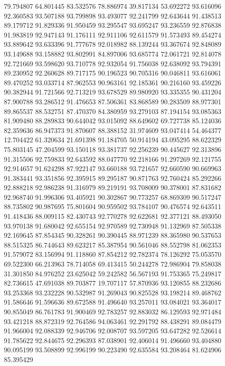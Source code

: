 79.794807
64.801445
83.532576
78.886974
39.817134
53.692272
93.616096
92.360583
93.507188
93.799898
93.493077
92.241799
92.643644
91.438513
89.179712
91.829336
91.950459
93.295547
93.695247
93.236559
92.876838
91.983819
92.947143
91.176111
92.911106
92.611579
91.573493
89.454274
93.889642
93.633396
91.777678
92.018982
88.139244
93.367674
92.848089
93.149688
93.158882
93.802991
84.897006
93.685774
72.061721
92.814078
92.721669
93.598620
93.710778
92.932054
91.756038
92.638092
93.794391
89.230952
92.260628
89.717175
90.196523
90.705316
90.046811
93.616061
89.470252
93.033714
87.962553
90.963161
92.185361
90.216160
93.459226
90.382944
91.721566
92.713219
93.678529
89.980920
93.335355
90.431204
87.900788
93.286512
91.476653
87.506361
83.868589
90.283509
88.977301
89.865537
88.532751
87.470370
84.380959
93.279103
87.194154
93.085363
81.909480
88.289833
90.644042
93.015092
88.649602
69.727738
85.124036
82.359636
86.947373
91.870607
88.388152
31.974609
93.047414
54.464377
12.704422
61.320634
21.691398
91.184705
50.914194
43.095295
88.622329
75.803145
47.204599
93.150118
93.381737
92.256239
90.445627
92.313896
91.315506
92.759833
92.643592
88.047770
92.218166
91.297269
92.121755
92.914657
91.624298
87.922147
93.660188
93.721657
92.660590
90.669963
91.383441
93.351856
92.395915
89.295187
90.871763
92.760424
85.292266
92.888218
92.986238
91.316979
89.219191
93.708009
90.378001
87.831682
92.968740
91.996306
93.405921
90.302867
90.773257
68.869309
90.517247
88.735802
90.987695
75.801604
90.959502
93.784107
90.476574
92.643511
91.418436
88.009115
82.430743
92.770278
92.622681
92.377121
88.493050
93.970138
91.680042
92.655154
92.970589
92.730948
91.132969
87.505338
92.169645
87.854345
90.328261
90.390445
88.971239
88.365980
90.537653
88.515325
86.744643
89.623217
85.387954
90.561046
88.552798
81.062353
91.579072
83.156994
91.118860
87.854212
92.782374
78.126292
75.053570
69.522300
66.213963
78.714058
69.413415
50.244278
72.986904
79.858038
31.301850
84.976252
23.625042
59.242582
56.567193
91.753365
75.249817
82.736615
47.691038
89.703877
19.707117
57.870936
93.120855
88.232686
93.253368
93.232228
90.532987
91.269043
90.825528
93.198214
89.468762
91.586646
91.596636
89.672588
91.496640
93.257011
93.084021
93.364017
90.855049
86.761783
91.900469
92.783257
92.883032
86.129593
92.971484
93.421218
88.872319
92.764586
94.063461
92.291792
88.438291
89.084479
91.966004
92.088339
92.946706
92.008707
93.597205
93.647282
92.526614
91.785622
92.844675
92.296393
87.038901
92.406014
91.496660
93.404880
90.095199
93.508899
92.996199
90.223490
92.635584
93.208464
81.624906
85.395429
